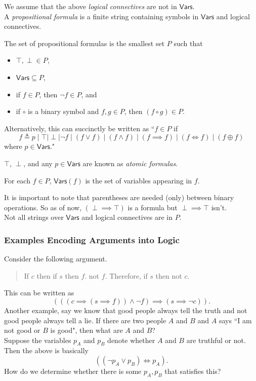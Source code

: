 We assume that the above \textit{logical connectives} are not in $\mathsf{Vars}$.\\
A \textit{propositional formula} is a finite string containing symbols in $\mathsf{Vars}$ and logical connectives.

\begin{definition}
The set of propositional formulas is the smallest set $P$ such that
\begin{itemize}
    \item $\top,\perp\in P$,
    \item $\mathsf{Vars}\subseteq P$,
    \item if $f\in P$, then $\neg f\in P$, and
    \item if $\circ$ is a binary symbol and $f,g\in P$, then $(f\circ g)\in P$.
\end{itemize}
\end{definition}

Alternatively, this can succinctly be written as ``$f \in P$ if
\[f \triangleq p\mid\top\mid\perp\mid \neg f \mid (f\vee f) \mid (f\wedge f) \mid (f\implies f) \mid (f\iff f) \mid (f\oplus f) \]
where $p\in\mathsf{Vars}$."

\begin{definition}
$\top$, $\perp$, and any $p\in\mathsf{Vars}$ are known as \textit{atomic formulas}.
\end{definition}

\begin{definition}
For each $f\in P$, $\mathsf{Vars}(f)$ is the set of variables appearing in $f$.
\end{definition}

It is important to note that parentheses are needed (only) between binary operations. So as of now, $(\perp\implies\top)$ is a formula but $\perp\implies\top$ isn't.\\
Not all strings over $\mathsf{Vars}$ and logical connectives are in $P$.

\subsubsection{Examples Encoding Arguments into Logic}

Consider the following argument.
\begin{quote}
    If $c$ then if $s$ then $f$. not $f$. Therefore, if $s$ then not $c$.
\end{quote}
This can be written as
\[ (((c\implies (s\implies f)) \wedge \neg f) \implies (s \implies \neg c)). \]
Another example, say we know that good people always tell the truth and not good people always tell a lie. If there are two people $A$ and $B$ and $A$ says ``I am not good or $B$ is good", then what are $A$ and $B$?\\
Suppose the variables $p_A$ and $p_B$ denote whether $A$ and $B$ are truthful or not. Then the above is basically
\[ ((\neg p_A \vee p_B) \iff p_A). \]
How do we determine whether there is some $p_A,p_B$ that satisfies this?

